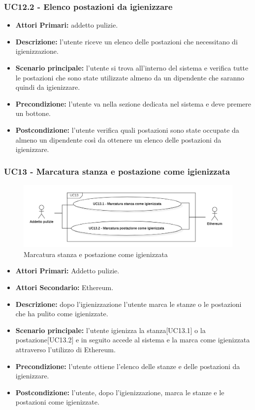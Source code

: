 \subsubsection{UC12.2 - Elenco postazioni da igienizzare}
\begin{itemize}
           	\item\textbf{Attori Primari:} addetto pulizie.
           	\item\textbf{Descrizione:} l'utente riceve un elenco delle postazioni che necessitano di igienizzazione.
           	\item\textbf{Scenario principale:} l'utente si trova all'interno del sistema e verifica tutte le postazioni che sono state utilizzate almeno da un dipendente 	che saranno quindi da igienizzare.
           	\item\textbf{Precondizione:} l'utente va nella sezione dedicata nel sistema e deve premere un bottone.
           	\item\textbf{Postcondizione:} l'utente verifica quali postazioni sono state occupate da almeno un dipendente così da ottenere un elenco delle postazioni da igienizzare.
\end{itemize}

\subsubsection{ UC13 - Marcatura stanza e postazione come igienizzata}
\begin{figure}[H]
		\centering
		\includegraphics[width=18cm]{res/images/UC13.png}
		\caption{Marcatura stanza e postazione come igienizzata}
		\label{fig:Marcatura stanza e postazione come igienizzata}
	\end{figure}
\begin{itemize}
           	\item\textbf{Attori Primari:} Addetto pulizie.
		\item\textbf{Attori Secondario:} Ethereum.
           	\item\textbf{Descrizione:} dopo l'igienizzazione l'utente marca le stanze o le postazioni che ha pulito come igienizzate.
           	\item\textbf{Scenario principale:} l'utente igienizza la stanza[UC13.1] o la postazione[UC13.2] e in seguito accede al sistema e la marca come igienizzata attraverso l'utilizzo di Ethereum.
           	\item\textbf{Precondizione:} l'utente ottiene l'elenco delle stanze e delle postazioni da igienizzare.
           	\item\textbf{Postcondizione:} l'utente, dopo l'igienizzazione, marca le stanze e le postazioni come igienizzate.
\end{itemize}
